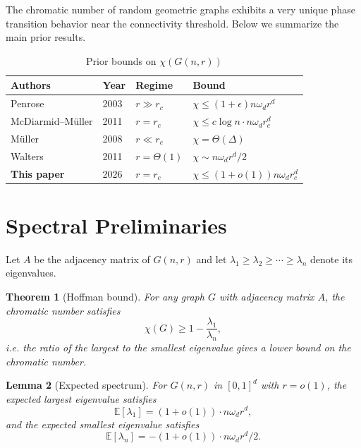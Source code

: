 \documentclass[11pt]{article}
\newtheorem{theorem}{Theorem}[section]
\newtheorem{lemma}[theorem]{Lemma}
\theoremstyle{definition}
\begin{document}
The chromatic number of random geometric graphs exhibits a very unique
phase transition behavior near the connectivity threshold. Below we
summarize the main prior results.

\begin{table}[htbp]
\centering
\caption{Prior bounds on $\chi(G(n, r))$}\label{tab:prior-bounds}
\begin{tabular}{@{}llll@{}}
\toprule
Authors & Year & Regime & Bound \\
\midrule
Penrose \cite{penrose2003random} & 2003 & $r \gg r_c$ & $\chi \leq (1+\epsilon) n\omega_d r^d$ \\
McDiarmid--M\"uller \cite{mcdiarmid2011chromatic} & 2011 & $r = r_c$ & $\chi \leq c \log n \cdot n\omega_d r_c^d$ \\
M\"uller \cite{muller2008lower} & 2008 & $r \ll r_c$ & $\chi = \Theta(\Delta)$ \\
Walters \cite{walters2011random} & 2011 & $r = \Theta(1)$ & $\chi \sim n\omega_d r^d / 2$ \\
\textbf{This paper} & 2026 & $r = r_c$ & $\chi \leq (1+o(1)) n\omega_d r_c^d$ \\
\bottomrule
\end{tabular}
\end{table}


\section{Spectral Preliminaries}

Let $A$ be the adjacency matrix of $G(n, r)$ and let $\lambda_1 \geq
\lambda_2 \geq \cdots \geq \lambda_n$ denote its eigenvalues.

\begin{theorem}[Hoffman bound]
For any graph $G$ with adjacency matrix $A$, the chromatic number satisfies
\begin{equation}\label{eq:hoffman}
  \chi(G) \geq 1 - \frac{\lambda_1}{\lambda_n},
\end{equation}
i.e. the ratio of the largest to the smallest eigenvalue gives a lower
bound on the chromatic number.
\end{theorem}

\begin{lemma}[Expected spectrum]\label{lem:expected-spectrum}
For $G(n, r)$ in $[0,1]^d$ with $r = o(1)$, the expected largest
eigenvalue satisfies
\begin{equation}\label{eq:lambda1-bound}
  \mathbb{E}[\lambda_1] = (1 + o(1)) \cdot n \omega_d r^d,
\end{equation}
and the expected smallest eigenvalue satisfies
\begin{equation}\label{eq:lambdan-bound}
  \mathbb{E}[\lambda_n] = -(1 + o(1)) \cdot n \omega_d r^d / 2.
\end{equation}
\end{lemma}
\end{document}
